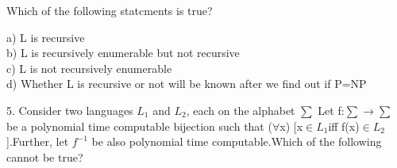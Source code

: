 \documentclass[a4paper]{article}
\begin{document}
\begin{flushleft}
Which of the following statcments is true?\\
\end{flushleft}
a)  L is recursive\\
b)  L is recursively enumerable but not recursive\\
c)  L is not recursively enumerable\\
d)  Whether L is recursive or not will be known after we find out if P=NP\\
\begin{flushleft}
5. Consider two languages $L_1$ and $L_2$, each on the alphabet $\sum$ Let f:$\sum$$\to$$\sum$ be a polynomial time computable bijection such that ($\forall$x) [x$\in$$L_1$iff f(x)$\in$$L_2$].Further, let $f^{-1}$ be also polynomial time computable.Which of the following cannot be true?\\
\end{flushleft}
\end{document}
